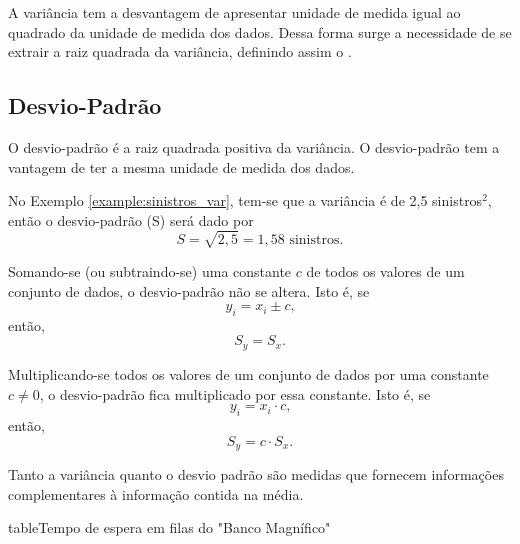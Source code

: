\documentclass[11pt,fleqn]{book}
\numberwithin{mpicture}{chapter}
\numberwithin{mtable}{chapter}
\numberwithin{mframe}{chapter}
\begin{document}
A variância tem a desvantagem de apresentar unidade de medida igual ao quadrado da unidade de medida dos dados. Dessa forma surge a necessidade de se extrair a raiz quadrada da variância, definindo assim o .

\subsection{Desvio-Padrão}

O desvio-padrão é a raiz quadrada positiva da variância. O desvio-padrão tem a vantagem de ter a mesma unidade de  medida dos dados.

\begin{example}
	No Exemplo \ref{example:sinistros_var}, tem-se que a variância é de 2,5 sinistros$^2$, então o desvio-padrão (S) será dado por
	\[
		S=\sqrt{2,5}=1,58\text{ sinistros.}
	\]
\end{example}

\begin{theorem}
	Somando-se (ou subtraindo-se) uma constante $c$ de todos os valores de um conjunto de dados, o desvio-padrão não se altera. Isto é, se
	\[
		y_i=x_i\pm c\text{,}
	\]
	então,
	\[
		S_y=S_x\text{.}
	\]
\end{theorem}

\begin{theorem}
	Multiplicando-se todos os valores de um conjunto de dados por uma constante $c\neq 0$, o desvio-padrão fica multiplicado por essa constante. Isto é, se
	\[
		y_i=x_i\cdot c\text{,}
	\]
	então,
	\[
		S_y=c\cdot S_x\text{.}
	\]
\end{theorem}

Tanto a variância quanto o desvio padrão são medidas que fornecem informações complementares à informação contida na média.

\begin{pageWidthArea}
	\begin{pageWidthAreaPicture}{table}{Tempo de espera em filas do "Banco Magnífico"}
		\label{table:banco_magnifico}
	\end{pageWidthAreaPicture}
\end{pageWidthArea}
\end{document}
